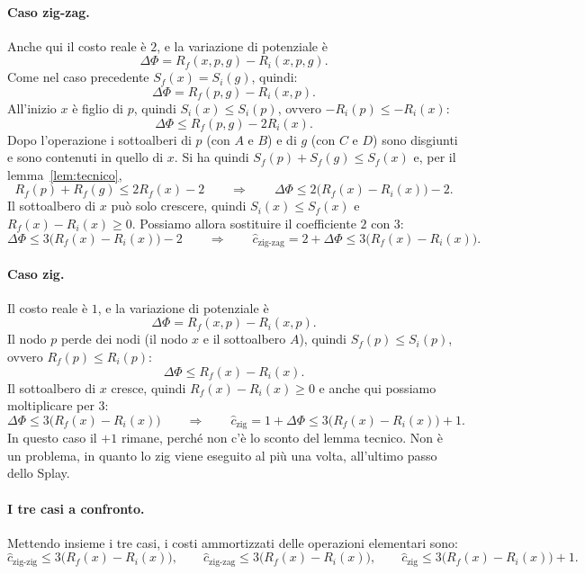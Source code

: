 \paragraph{Caso zig-zag.}
Anche qui il costo reale è $2$, e la variazione di potenziale è
\[
\Delta\Phi = R_f(x,p,g) - R_i(x,p,g).
\]
Come nel caso precedente $S_f(x) = S_i(g)$, quindi:
\[
\Delta\Phi = R_f(p,g) - R_i(x,p).
\]
All'inizio $x$ è figlio di $p$, quindi $S_i(x) \le S_i(p)$, ovvero $-R_i(p) \le -R_i(x)$:
\[
\Delta\Phi \le R_f(p,g) - 2R_i(x).
\]
Dopo l'operazione i sottoalberi di $p$ (con $A$ e $B$) e di $g$ (con $C$ e $D$) sono disgiunti e sono contenuti in quello di $x$. Si ha quindi $S_f(p) + S_f(g) \le S_f(x)$ e, per il lemma~\ref{lem:tecnico},
\[
R_f(p) + R_f(g) \le 2R_f(x) - 2 \qquad\Longrightarrow\qquad \Delta\Phi \le 2\big(R_f(x) - R_i(x)\big) - 2.
\]
Il sottoalbero di $x$ può solo crescere, quindi $S_i(x) \le S_f(x)$ e $R_f(x) - R_i(x) \ge 0$. Possiamo allora sostituire il coefficiente $2$ con $3$:
\[
\Delta\Phi \le 3\big(R_f(x) - R_i(x)\big) - 2 \qquad\Longrightarrow\qquad \hat{c}_{\text{zig-zag}} = 2 + \Delta\Phi \le 3\big(R_f(x) - R_i(x)\big).
\]

\paragraph{Caso zig.}
Il costo reale è $1$, e la variazione di potenziale è
\[
\Delta\Phi = R_f(x,p) - R_i(x,p).
\]
Il nodo $p$ perde dei nodi (il nodo $x$ e il sottoalbero $A$), quindi $S_f(p) \le S_i(p)$, ovvero $R_f(p) \le R_i(p)$:
\[
\Delta\Phi \le R_f(x) - R_i(x).
\]
Il sottoalbero di $x$ cresce, quindi $R_f(x) - R_i(x) \ge 0$ e anche qui possiamo moltiplicare per $3$:
\[
\Delta\Phi \le 3\big(R_f(x) - R_i(x)\big) \qquad\Longrightarrow\qquad \hat{c}_{\text{zig}} = 1 + \Delta\Phi \le 3\big(R_f(x) - R_i(x)\big) + 1.
\]
In questo caso il $+1$ rimane, perché non c'è lo sconto del lemma tecnico. Non è un problema, in quanto lo zig viene eseguito al più una volta, all'ultimo passo dello Splay.

\paragraph{I tre casi a confronto.}
Mettendo insieme i tre casi, i costi ammortizzati delle operazioni elementari sono:
\[
\hat{c}_{\text{zig-zig}} \le 3\big(R_f(x) - R_i(x)\big), \qquad
\hat{c}_{\text{zig-zag}} \le 3\big(R_f(x) - R_i(x)\big), \qquad
\hat{c}_{\text{zig}} \le 3\big(R_f(x) - R_i(x)\big) + 1.
\]


